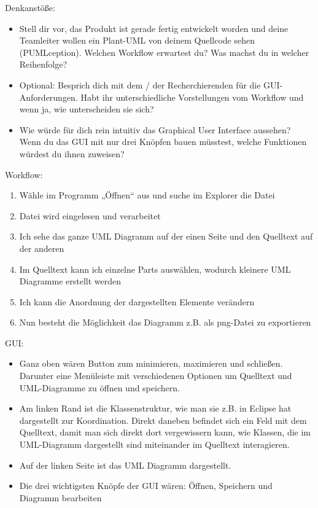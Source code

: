 Denkanstöße:
\begin{itemize}
\item Stell dir vor, das Produkt ist gerade fertig entwickelt worden und deine Teamleiter wollen ein Plant-UML von deinem Quellcode sehen (PUMLception). Welchen Workflow erwartest du? Was machst du in welcher Reihenfolge?
\item Optional: Besprich dich mit dem / der Recherchierenden für die GUI-Anforderungen. Habt ihr unterschiedliche Vorstellungen vom Workflow und wenn ja, wie unterscheiden sie sich?
\item Wie würde für dich rein intuitiv das Graphical User Interface aussehen? Wenn du das GUI mit nur drei Knöpfen bauen müsstest, welche Funktionen würdest du ihnen zuweisen?
\end{itemize}
Workflow:
\begin{enumerate}
\item Wähle im Programm „Öffnen“ aus und suche im Explorer die Datei
\item Datei wird eingelesen und verarbeitet
\item Ich sehe das ganze UML Diagramm auf der einen Seite und den Quelltext auf der anderen
\item Im Quelltext kann ich einzelne Parts auswählen, wodurch kleinere UML Diagramme erstellt werden
\item Ich kann die Anordnung der dargestellten Elemente verändern
\item Nun besteht die Möglichkeit das Diagramm z.B. als png-Datei zu exportieren
\end{enumerate}

GUI:
\begin{itemize}
\item Ganz oben wären Button zum minimieren, maximieren und schließen. Darunter eine Menüleiste mit verschiedenen Optionen um Quelltext und UML-Diagramme zu öffnen und speichern.
\item Am linken Rand ist die Klassenstruktur, wie man sie z.B. in Eclipse hat dargestellt zur Koordination. Direkt daneben befindet sich ein Feld mit dem Quelltext, damit man sich direkt dort vergewissern kann, wie Klassen, die im UML-Diagramm dargestellt sind miteinander im Quelltext interagieren.
\item Auf der linken Seite ist das UML Diagramm dargestellt.
\item Die drei wichtigsten Knöpfe der GUI wären: Öffnen, Speichern und Diagramm bearbeiten
\end{itemize}




\nsecend
